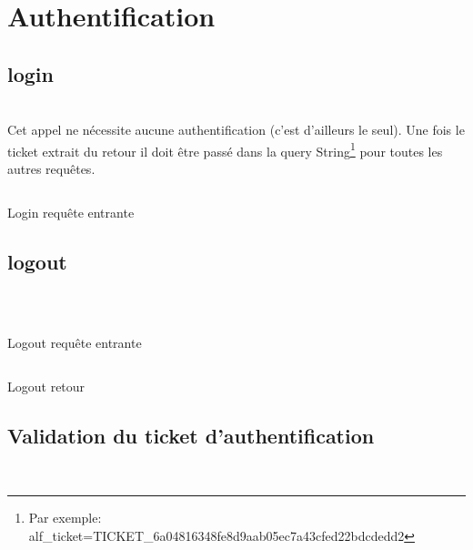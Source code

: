 \section{Authentification}

\subsection{login}
\\

Cet appel ne nécessite aucune authentification (c'est d'ailleurs le seul). Une fois le ticket extrait du retour il doit être passé dans la query String\footnote{Par exemple: alf\_ticket=TICKET\_6a04816348fe8d9aab05ec7a43cfed22bdcdedd2} pour toutes les autres requêtes.

\begin{codesnippet}
\inputminted[frame=single,linenos,fontsize=\footnotesize]{javascript}{extraits/login_in.js}
\caption{Login requête entrante}
\label{snip:login_in}
\end{codesnippet}


\subsection{logout}
\\

\begin{codesnippet}
\inputminted[frame=single,linenos,fontsize=\footnotesize]{javascript}{extraits/logout_in.js}
\caption{Logout requête entrante}
\label{snip:logout_in}
\end{codesnippet}

\begin{codesnippet}
\inputminted[frame=single,linenos,fontsize=\footnotesize]{javascript}{extraits/logout_out.js}
\caption{Logout retour}
\label{snip:logout_out}
\end{codesnippet}


\subsection{Validation du ticket d'authentification}
\\
